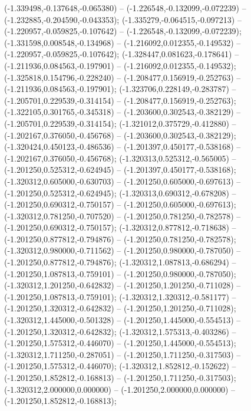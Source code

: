  (-1.339498,-0.137648,-0.065380) -- (-1.226548,-0.132099,-0.072239) -- (-1.232885,-0.204590,-0.043353);
 (-1.335279,-0.064515,-0.097213) -- (-1.220957,-0.059825,-0.107642) -- (-1.226548,-0.132099,-0.072239);
 (-1.331598,0.008548,-0.134968) -- (-1.216092,0.012355,-0.149532) -- (-1.220957,-0.059825,-0.107642);
 (-1.328447,0.081623,-0.178641) -- (-1.211936,0.084563,-0.197901) -- (-1.216092,0.012355,-0.149532);
 (-1.325818,0.154796,-0.228240) -- (-1.208477,0.156919,-0.252763) -- (-1.211936,0.084563,-0.197901);
 (-1.323706,0.228149,-0.283787) -- (-1.205701,0.229539,-0.314154) -- (-1.208477,0.156919,-0.252763);
 (-1.322105,0.301765,-0.345318) -- (-1.203600,0.302543,-0.382129) -- (-1.205701,0.229539,-0.314154);
 (-1.321012,0.375729,-0.412880) -- (-1.202167,0.376050,-0.456768) -- (-1.203600,0.302543,-0.382129);
 (-1.320424,0.450123,-0.486536) -- (-1.201397,0.450177,-0.538168) -- (-1.202167,0.376050,-0.456768);
 (-1.320313,0.525312,-0.565005) -- (-1.201250,0.525312,-0.624945) -- (-1.201397,0.450177,-0.538168);
 (-1.320312,0.605000,-0.630703) -- (-1.201250,0.605000,-0.697613) -- (-1.201250,0.525312,-0.624945);
 (-1.320313,0.690312,-0.678208) -- (-1.201250,0.690312,-0.750157) -- (-1.201250,0.605000,-0.697613);
 (-1.320312,0.781250,-0.707520) -- (-1.201250,0.781250,-0.782578) -- (-1.201250,0.690312,-0.750157);
 (-1.320312,0.877812,-0.718638) -- (-1.201250,0.877812,-0.794876) -- (-1.201250,0.781250,-0.782578);
 (-1.320312,0.980000,-0.711562) -- (-1.201250,0.980000,-0.787050) -- (-1.201250,0.877812,-0.794876);
 (-1.320312,1.087813,-0.686294) -- (-1.201250,1.087813,-0.759101) -- (-1.201250,0.980000,-0.787050);
 (-1.320312,1.201250,-0.642832) -- (-1.201250,1.201250,-0.711028) -- (-1.201250,1.087813,-0.759101);
 (-1.320312,1.320312,-0.581177) -- (-1.201250,1.320312,-0.642832) -- (-1.201250,1.201250,-0.711028);
 (-1.320312,1.445000,-0.501328) -- (-1.201250,1.445000,-0.554513) -- (-1.201250,1.320312,-0.642832);
 (-1.320312,1.575313,-0.403286) -- (-1.201250,1.575312,-0.446070) -- (-1.201250,1.445000,-0.554513);
 (-1.320312,1.711250,-0.287051) -- (-1.201250,1.711250,-0.317503) -- (-1.201250,1.575312,-0.446070);
 (-1.320312,1.852812,-0.152622) -- (-1.201250,1.852812,-0.168813) -- (-1.201250,1.711250,-0.317503);
 (-1.320312,2.000000,0.000000) -- (-1.201250,2.000000,0.000000) -- (-1.201250,1.852812,-0.168813);
